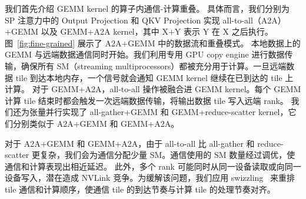 
 我们首先介绍 GEMM kernel 的算子内通信-计算重叠。
具体而言，我们分别为 SP 注意力中的 Output Projection 和 QKV Projection 实现 all-to-all（A2A）+GEMM 以及 GEMM+A2A kernel，其中 X+Y 表示 Y 在 X 之后执行。
图~\ref{fig:fine-grained} 展示了 A2A+GEMM 中的数据流和重叠模式。
本地数据上的 GEMM 与远端数据通信同时开始。我们利用专用 GPU copy engine 进行数据传输，确保所有 SM（streaming multiprocessors）都被充分用于计算。一旦远端数据 tile 到达本地内存，一个信号就会通知 GEMM kernel 继续在已到达的 tile 上计算。
对于 GEMM+A2A，all-to-all 操作被融合进 GEMM kernel。每个 GEMM 计算 tile 结束时都会触发一次远端数据传输，将输出数据 tile 写入远端 rank。
我们还为张量并行实现了 all-gather+GEMM 和 GEMM+reduce-scatter kernel，它们分别类似于 A2A+GEMM 和 GEMM+A2A。

对于 A2A+GEMM 和 GEMM+A2A，由于 all-to-all 比 all-gather 和 reduce-scatter 更复杂，我们会为通信分配少量 SM。通信使用的 SM 数量经过调优，使通信和计算表现出相近延迟。
此外，多个 rank 可能同时从同一设备读取或向同一设备写入，潜在造成 NVLink 竞争。为缓解该问题，我们应用 swizzling~\cite{chang2024flux, zhang2025comet, zheng2025tilelink} 来重排 tile 通信和计算顺序，使通信 tile 的到达节奏与计算 tile 的处理节奏对齐。


